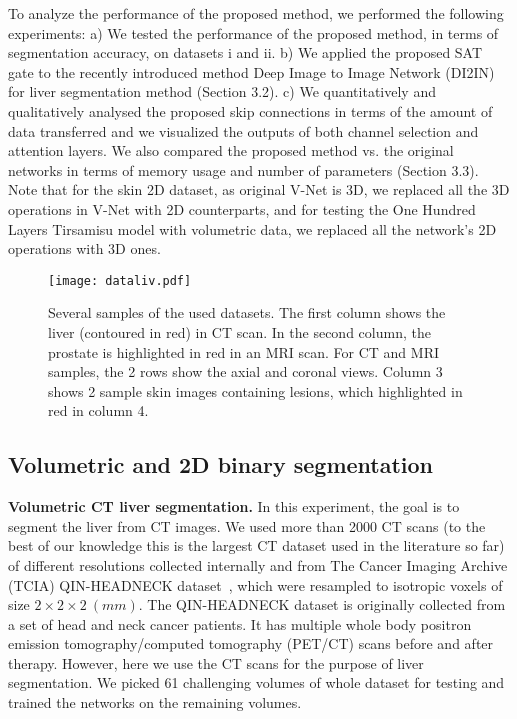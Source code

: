 \documentclass{article}
\begin{document}
To analyze the performance of the proposed method, we performed the following experiments: a) We tested the performance of the proposed method, in terms of segmentation accuracy, on datasets i and ii.
b) We applied the proposed SAT gate to the recently introduced method Deep Image to Image Network (DI2IN) ~\cite{yang2017automatic} for liver segmentation method (Section 3.2).
c) We quantitatively and qualitatively analysed the proposed skip connections in terms of the amount of data transferred and we visualized the outputs of both channel selection and attention layers. We also compared the proposed method vs. the original networks in terms of memory usage and number of parameters (Section 3.3). Note that for the skin 2D dataset, as original V-Net is 3D, we replaced all the 3D operations in V-Net with 2D counterparts, and for testing the One Hundred Layers Tirsamisu model with volumetric data, we replaced all the network's 2D operations with 3D ones.

\begin{figure}
\centering
\texttt{[image: dataliv.pdf]}
\caption{Several samples of the used datasets. The first column shows the liver (contoured in red) in CT scan. In the second column, the prostate is highlighted in red in an MRI scan. For CT and MRI samples, the 2 rows show the axial and coronal views. Column 3  shows 2 sample skin images containing lesions, which highlighted in red in column 4.}
\label{figure3}
\end{figure}


\subsection{Volumetric and 2D binary segmentation}

\textbf{Volumetric CT liver segmentation.} In this experiment, the goal is to segment the liver from CT images. We used more than 2000 CT scans (to the best of our knowledge this is the largest CT dataset used in the literature so far) of different resolutions collected internally and from The Cancer Imaging Archive (TCIA) QIN-HEADNECK dataset~\cite{QINheadNeck2015, QINheadNeck2016, clark2013cancer}, which were resampled to isotropic voxels of size $2\times2\times2 \ (mm)$. The QIN-HEADNECK dataset is originally collected from a set of head and neck cancer patients. It has multiple whole body positron emission tomography/computed tomography (PET/CT) scans before and after therapy. However, here we use the CT scans for the purpose of liver segmentation. We picked 61 challenging volumes of whole dataset for testing and trained the networks on the remaining volumes.
\end{document}
